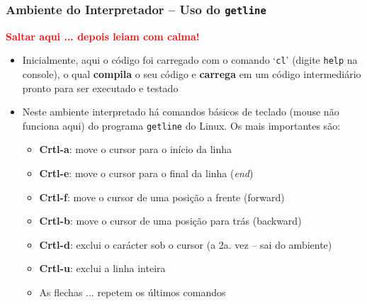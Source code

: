 \begin{frame}[fragile]
\frametitle{Ambiente do Interpretador -- Uso do \texttt{getline}}

\textbf{\textcolor{red}{Saltar aqui ... depois leiam com calma!}}  

\begin{itemize}
  \item Inicialmente, aqui o código foi carregado com o comando `\texttt{cl}' (digite \texttt{help} na console), o qual \textbf{compila} o seu código e \textbf{carrega} em um código intermediário pronto
  para ser executado e testado
  
  \pause
  \item Neste ambiente interpretado há comandos básicos de teclado (mouse não funciona aqui)
  do programa \texttt{getline} do Linux. Os mais importantes são:
  \pause
  \begin{itemize}
    \item  \textbf{Crtl-a}: move o cursor para o início da linha
        \item  \textbf{Crtl-e}: move o cursor para o final da linha (\textit{end})
        \item  \textbf{Crtl-f}: 	move o cursor de uma posição a frente (forward)
         \item  \textbf{Crtl-b}: 	move o cursor de uma posição para trás (backward)
         \item  \textbf{Crtl-d}: 	exclui o carácter sob  o cursor (a 2a. vez -- sai do ambiente)
        \item  \textbf{Crtl-u}: 	exclui a linha inteira
        \item As flechas ... repetem os últimos comandos
  \end{itemize}
  
\end{itemize}

\end{frame}



